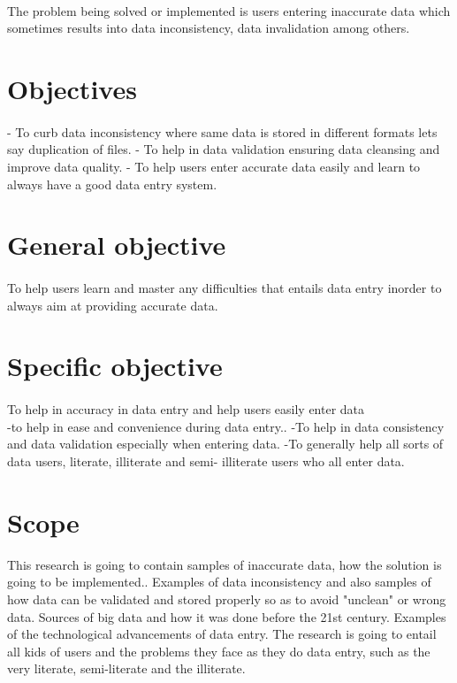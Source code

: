 \documentclass[12pt,]{article}
\begin{document}
\paragraph*{}
The problem being solved or implemented is users entering inaccurate data which sometimes results into data inconsistency, data invalidation among others.

\section{
\textbf{Objectives}}
\paragraph*{}
-	To curb data inconsistency where same data is stored in different formats lets say duplication of files.
-	To help in data validation ensuring data cleansing and improve data quality.
-	To help users enter accurate data easily and learn to always have a good data entry system.

\section{
\textbf{General objective}}
\paragraph*{}
To help users learn and master any difficulties that entails data entry inorder to always aim at providing accurate data.

\section{
\textbf{Specific objective}}
\paragraph*{}
To help in accuracy in data entry and help users easily enter data
\\
-to help in ease and convenience during data entry..
-To help in data consistency and data validation especially when entering data.
-To generally help all sorts of data users, literate, illiterate and semi- illiterate users who all enter data.

\section{
\textbf{Scope}}
This research is going to contain samples of inaccurate data, how the solution is going to be implemented.. Examples of data inconsistency and also samples of how data can be validated and stored properly so as to avoid "unclean" or wrong data. Sources of big data and how it was done before the 21st century. Examples of the technological advancements of data entry. The research is going to entail all kids of users and the problems they face as they do data entry, such as the very literate, semi-literate and the illiterate.
  
\end{document}
